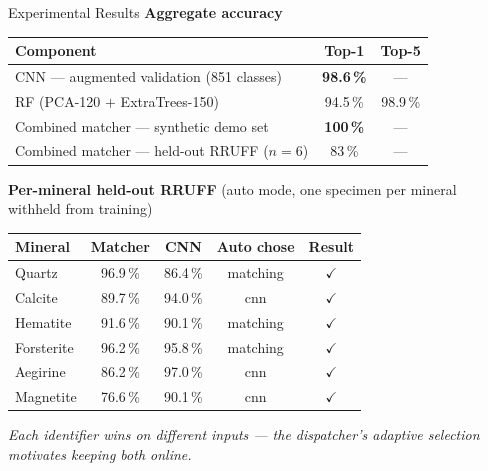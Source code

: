 \documentclass[aspectratio=169,10pt]{beamer}
\begin{document}
\begin{frame}{Experimental Results}
  \textbf{\color{headerbg}Aggregate accuracy}

  \smallskip
  \footnotesize
  \begin{tabular}{@{}lcc@{}}
    \toprule
    \textbf{Component} & \textbf{Top-1} & \textbf{Top-5}\\
    \midrule
    CNN --- augmented validation (851 classes) & \textbf{98.6\,\%} & ---\\
    RF (PCA-120 $+$ ExtraTrees-150)
      & 94.5\,\% & 98.9\,\%\\
    Combined matcher --- synthetic demo set
      & \textbf{100\,\%} & ---\\
    Combined matcher --- held-out RRUFF ($n{=}6$)
      & 83\,\% & ---\\
    \bottomrule
  \end{tabular}

  \vspace{0.22cm}
  \textbf{\color{headerbg}Per-mineral held-out RRUFF} (auto mode,
  one specimen per mineral withheld from training)

  \smallskip
  \begin{tabular}{@{}lcccc@{}}
    \toprule
    \textbf{Mineral} & \textbf{Matcher} & \textbf{CNN}
      & \textbf{Auto chose} & \textbf{Result}\\
    \midrule
    Quartz     & 96.9\,\% & 86.4\,\% & matching & $\checkmark$\\
    Calcite    & 89.7\,\% & 94.0\,\% & cnn      & $\checkmark$\\
    Hematite   & 91.6\,\% & 90.1\,\% & matching & $\checkmark$\\
    Forsterite & 96.2\,\% & 95.8\,\% & matching & $\checkmark$\\
    Aegirine   & 86.2\,\% & 97.0\,\% & cnn      & $\checkmark$\\
    Magnetite
      & \textcolor{accent}{76.6\,\%} & 90.1\,\% & cnn
      & $\checkmark$\;{\tiny(matcher$\to$Westerveldite)}\\
    \bottomrule
  \end{tabular}

  \vspace{0.15cm}
  \footnotesize\textit{Each identifier wins on different inputs ---
  the dispatcher's adaptive selection motivates keeping both online.}
\end{frame}
\end{document}
